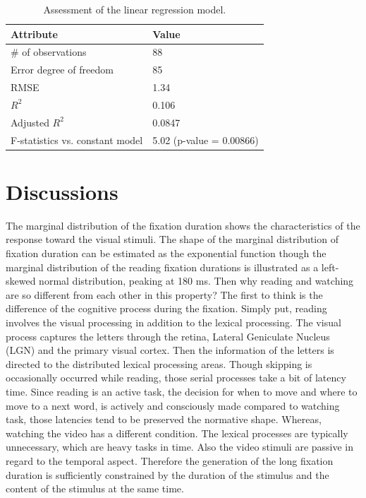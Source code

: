 \documentclass[oneside,master]{snueethesis}
\begin{document}
\begin{table}[ht]
\begin{center} 
\caption{Assessment of the linear regression model.} 
\vskip 0.12in
\label{tab:lr-goodness} 
\begin{tabular}{ll} 
\hline
Attribute   & Value \\ 
\hline
\# of observations & 88 \\
Error degree of freedom & 85 \\
RMSE & 1.34 \\
$R^{2}$ & 0.106 \\
Adjusted $R^{2}$ & 0.0847 \\
F-statistics vs. constant model & 5.02 (p-value = 0.00866) \\
\hline
\end{tabular} 
\end{center} 
\end{table}

\chapter{Discussions}

The marginal distribution of the fixation duration shows the characteristics of the response toward the visual stimuli. The shape of the marginal distribution of fixation duration can be estimated as the exponential function though the marginal distribution of the reading fixation durations is illustrated as a left-skewed normal distribution, peaking at 180 ms. Then why reading and watching are so different from each other in this property? The first to think is the difference of the cognitive process during the fixation. Simply put, reading involves the visual processing in addition to the lexical processing. The visual process captures the letters through the retina, Lateral Geniculate Nucleus (LGN) and the primary visual cortex. Then the information of the letters is directed to the distributed lexical processing areas. Though skipping is occasionally occurred while reading, those serial processes take a bit of latency time. Since reading is an active task, the decision for when to move and where to move to a next word, is actively and consciously made compared to watching task, those latencies tend to be preserved the normative shape. Whereas, watching the video has a different condition. The lexical processes are typically unnecessary, which are heavy tasks in time. Also the video stimuli are passive in regard to the temporal aspect. Therefore the generation of the long fixation duration is sufficiently constrained by the duration of the stimulus and the content of the stimulus at the same time. 
\end{document}
